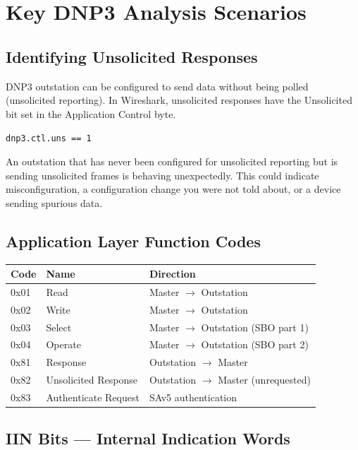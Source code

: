 \documentclass[12pt,twoside,openright]{memoir}
\newcommand{\filter}[1]{\texttt{\color{wsblue}#1}}
\begin{document}
\section{Key DNP3 Analysis Scenarios}

\subsection{Identifying Unsolicited Responses}

DNP3 outstation can be configured to send data without being polled (unsolicited reporting). In Wireshark, unsolicited responses have the Unsolicited bit set in the Application Control byte.

\begin{filterbox}
\filter{dnp3.ctl.uns == 1}
\end{filterbox}

An outstation that has never been configured for unsolicited reporting but is sending unsolicited frames is behaving unexpectedly. This could indicate misconfiguration, a configuration change you were not told about, or a device sending spurious data.

\subsection{Application Layer Function Codes}

\begin{center}
\begin{tabular}{C{2cm}L{4cm}L{5cm}}
\toprule
{}
\textbf{Code} & \textbf{Name} & \textbf{Direction} \\
\midrule
0x01 & Read & Master $\to$ Outstation \\
0x02 & Write & Master $\to$ Outstation \\
0x03 & Select & Master $\to$ Outstation (SBO part 1) \\
0x04 & Operate & Master $\to$ Outstation (SBO part 2) \\
0x81 & Response & Outstation $\to$ Master \\
0x82 & Unsolicited Response & Outstation $\to$ Master (unrequested) \\
0x83 & Authenticate Request & SAv5 authentication \\
\bottomrule
\end{tabular}
\end{center}

\subsection{IIN Bits --- Internal Indication Words}
\end{document}
